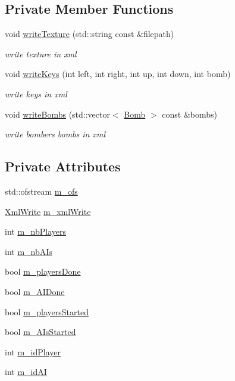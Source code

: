 \subsection*{Private Member Functions}
\begin{DoxyCompactItemize}
\item 
void \hyperlink{class_xml_save_a71f6f21d017db69b6c90e55c31ff01ff}{write\+Texture} (std\+::string const \&filepath)
\begin{DoxyCompactList}\small\item\em write texture in xml \end{DoxyCompactList}\item 
void \hyperlink{class_xml_save_a74407fe26dcd64701a6d060d8457a945}{write\+Keys} (int left, int right, int up, int down, int bomb)
\begin{DoxyCompactList}\small\item\em write keys in xml \end{DoxyCompactList}\item 
void \hyperlink{class_xml_save_ac4d5271a4ede082a3e5b60f79bea555c}{write\+Bombs} (std\+::vector$<$ \hyperlink{class_bomb}{Bomb} $>$ const \&bombs)
\begin{DoxyCompactList}\small\item\em write bomber\textquotesingle{}s bombs in xml \end{DoxyCompactList}\end{DoxyCompactItemize}
\subsection*{Private Attributes}
\begin{DoxyCompactItemize}
\item 
std\+::ofstream \hyperlink{class_xml_save_a06964370050c4b4791be4d283cf2e1d3}{m\+\_\+ofs}
\item 
\hyperlink{class_xml_write}{Xml\+Write} \hyperlink{class_xml_save_a56f35c6efd7b1a1e2e795bb53dbda194}{m\+\_\+xml\+Write}
\item 
int \hyperlink{class_xml_save_a74aefcd3daf12a9bf12ea768459d66b3}{m\+\_\+nb\+Players}
\item 
int \hyperlink{class_xml_save_a1fa82deb2905a7882354ef5cb4e96efd}{m\+\_\+nb\+A\+Is}
\item 
bool \hyperlink{class_xml_save_a95ea43610318f8de62b9e056c26859c2}{m\+\_\+players\+Done}
\item 
bool \hyperlink{class_xml_save_afb6a6d77bda66306dfac234dcae5248e}{m\+\_\+\+A\+I\+Done}
\item 
bool \hyperlink{class_xml_save_a8f2184f264a26945bb89eaa0b4e1d1c3}{m\+\_\+players\+Started}
\item 
bool \hyperlink{class_xml_save_a29c99f1952be494ebe9fa73275a3e9cc}{m\+\_\+\+A\+Is\+Started}
\item 
int \hyperlink{class_xml_save_a35dfc6619f277f16c41b53125036da0e}{m\+\_\+id\+Player}
\item 
int \hyperlink{class_xml_save_a13de35f1c25f9d3a0261b08dd9c915ee}{m\+\_\+id\+A\+I}
\end{DoxyCompactItemize}


